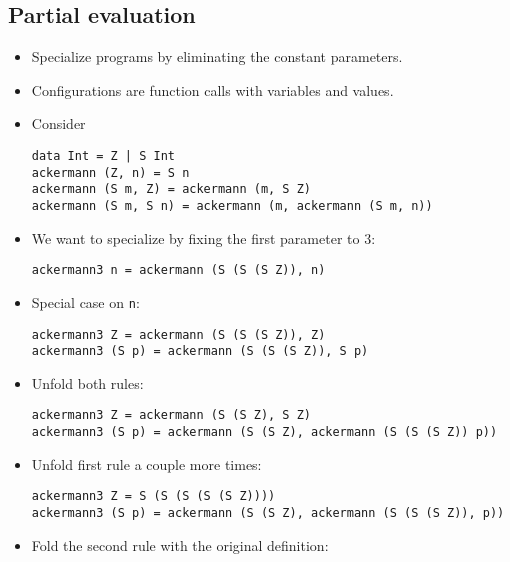\subsection{Partial evaluation}

\begin{itemize}

\item Specialize programs by eliminating the constant parameters.

\item Configurations are function calls with variables and values.

\item Consider

\begin{verbatim}
data Int = Z | S Int
ackermann (Z, n) = S n
ackermann (S m, Z) = ackermann (m, S Z)
ackermann (S m, S n) = ackermann (m, ackermann (S m, n))
\end{verbatim}

\item We want to specialize by fixing the first parameter to $3$:

\begin{verbatim}
ackermann3 n = ackermann (S (S (S Z)), n)
\end{verbatim}

\item Special case on \texttt{n}:

\begin{verbatim}
ackermann3 Z = ackermann (S (S (S Z)), Z)
ackermann3 (S p) = ackermann (S (S (S Z)), S p)
\end{verbatim}

\item Unfold both rules:

\begin{verbatim}
ackermann3 Z = ackermann (S (S Z), S Z)
ackermann3 (S p) = ackermann (S (S Z), ackermann (S (S (S Z)) p))
\end{verbatim}

\item Unfold first rule a couple more times:

\begin{verbatim}
ackermann3 Z = S (S (S (S (S Z))))
ackermann3 (S p) = ackermann (S (S Z), ackermann (S (S (S Z)), p))
\end{verbatim} 

\item Fold the second rule with the original definition:


\end{itemize}
